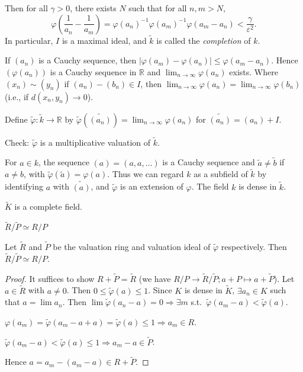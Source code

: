\documentclass[11pt, a4paper]{report}
\begin{document}
Then for all $\gamma>0$, there exists $N$ such that for all $n, m>N$,
\[
\varphi\left(\frac{1}{a_{n}}-\frac{1}{a_{m}}\right)=\varphi\left(a_{n}\right)^{-1} \varphi\left(a_{m}\right)^{-1} \varphi\left(a_{m}-a_{n}\right)<\frac{\gamma}{\varepsilon^{2}}.
\]
In particular, $I$ is a maximal ideal, and $\widetilde{k}$ is called the \emph{completion} of $k$.

If $\left(a_{n}\right)$ is a Cauchy sequence, then $\left|\varphi\left(a_{m}\right)-\varphi\left(a_{n}\right)\right| \leq \varphi\left(a_{m}-a_{n}\right)$. Hence $\left(\varphi\left(a_{n}\right)\right)$ is a Cauchy sequence in $\mathbb{R}$ and $\lim _{n \rightarrow \infty} \varphi\left(a_{n}\right)$ exists. Where $\left(x_{n}\right) \sim\left(y_{n}\right)$ if $\left(a_{n}\right)-\left(b_{n}\right) \in I$, then $\lim _{n \rightarrow \infty} \varphi\left(a_{n}\right)=\lim _{n \rightarrow \infty} \varphi\left(b_{n}\right)$ (i.e., if $d\left(x_{n}, y_{n}\right) \rightarrow 0$).

Define $\tilde{\varphi}: \widetilde{k} \rightarrow \mathbb{R}$ by $\tilde{\varphi}\left(\widetilde{\left(a_{n}\right)}\right) = \lim _{n \rightarrow \infty} \varphi\left(a_{n}\right)$ for $\widetilde{\left(a_{n}\right)}=\left(a_{n}\right)+I$.

Check: $\tilde{\varphi}$ is a multiplicative valuation of $\tilde{k}$.

For $a \in k$, the sequence $(a)=(a, a, \ldots)$ is a Cauchy sequence and $\tilde{a} \neq \tilde{b}$ if $a \neq b$, with $\tilde{\varphi}(\tilde{a})=\varphi(a)$. Thus we can regard $k$ as a subfield of $\tilde{k}$ by identifying $a$ with $\tilde{(a)}$, and $\tilde{\varphi}$ is an extension of $\varphi$. The field $k$ is dense in $\tilde{k}$.
\begin{lemma}
$\widetilde{K}$ is a complete field.
\end{lemma}

\begin{theorem}
$\tilde{R} / \tilde{P} \simeq R / P$

Let $\tilde{R}$ and $\tilde{P}$ be the valuation ring and valuation ideal of $\tilde{\varphi}$ respectively. Then $\tilde{R} / \tilde{P} \simeq R / P$.
\end{theorem}

\begin{proof}
It suffices to show $R+\widetilde{P}=\widetilde{R}$ (we have $R / P \rightarrow \widetilde{R} / \widetilde{P} ; a+P \mapsto a+\widetilde{P}$). Let $a \in \widetilde{R}$ with $a \neq 0$. Then $0 \leq \widetilde{\varphi}(a) \leq 1$. Since $K$ is dense in $\widetilde{K}$, $\exists a_n \in K$ such that $a=\lim a_n$. Then $\lim \tilde{\varphi}\left(a_{n}-a\right)=0 \Rightarrow \exists m$ s.t.\ $\tilde{\varphi}\left(a_{m}-a\right)<\tilde{\varphi}(a)$.

$\varphi\left(a_{m}\right)=\tilde{\varphi}\left(a_{m}-a+a\right)=\tilde{\varphi}(a) \leqslant 1 \Rightarrow a_{m} \in R$.

$\tilde{\varphi}\left(a_{m}-a\right)<\tilde{\varphi}(a) \leq 1 \Rightarrow a_{m}-a \in \widetilde{P}$.

Hence $a=a_{m}-\left(a_{m}-a\right) \in R+\widetilde{P}$.
\end{proof}
\end{document}
